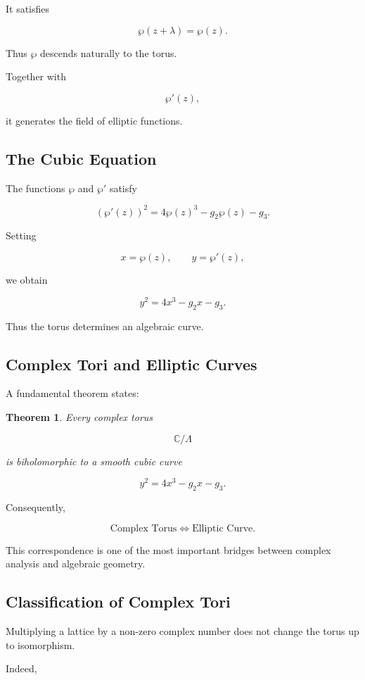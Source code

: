 \documentclass[12pt,a4paper]{article}
\newtheorem{theorem}{Theorem}[section]
\theoremstyle{notespace}
\begin{document}
It satisfies

\[
\wp(z+\lambda)=\wp(z).
\]

Thus \(\wp\) descends naturally to the torus.

Together with

\[
\wp'(z),
\]

it generates the field of elliptic functions.

\subsection{The Cubic Equation}

The functions \(\wp\) and \(\wp'\) satisfy

\[
(\wp'(z))^2
=
4\wp(z)^3
-
g_2\wp(z)
-
g_3.
\]

Setting

\[
x=\wp(z),
\qquad
y=\wp'(z),
\]

we obtain

\[
y^2
=
4x^3-g_2x-g_3.
\]

Thus the torus determines an algebraic curve.

\subsection{Complex Tori and Elliptic Curves}

A fundamental theorem states:

\begin{theorem}
	Every complex torus
	
	\[
	\mathbb C/\Lambda
	\]
	
	is biholomorphic to a smooth cubic curve
	
	\[
	y^2
	=
	4x^3-g_2x-g_3.
	\]
\end{theorem}

Consequently,

\[
\boxed{
	\text{Complex Torus}
	\Longleftrightarrow
	\text{Elliptic Curve}.
}
\]

This correspondence is one of the most important bridges between complex analysis and algebraic geometry.

\subsection{Classification of Complex Tori}

Multiplying a lattice by a non-zero complex number does not change the torus up to isomorphism.

Indeed,
\end{document}
